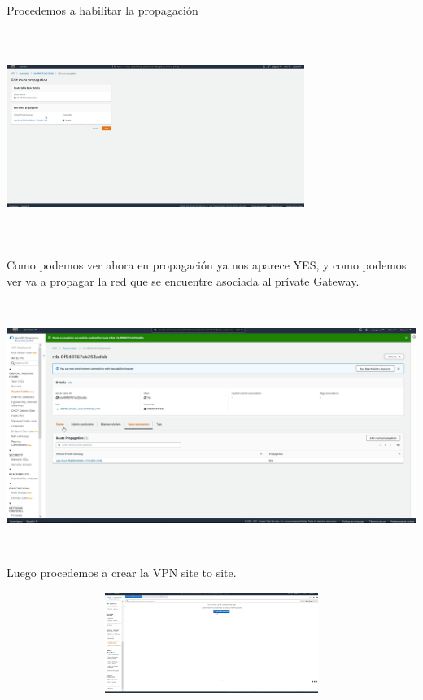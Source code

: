 \documentclass{article} %
\begin{document}
\noindent 

\noindent Procedemos a habilitar la propagaci\'{o}n

\noindent 

\noindent \includegraphics*[width=3.81in, height=2.72in, trim=0.00in 2.13in 6.39in 0.00in]{image18}

\noindent Como podemos ver ahora en propagaci\'{o}n ya nos aparece YES, y como podemos ver va a propagar la red que se encuentre asociada al pr\'{i}vate Gateway. 

\noindent 

\noindent \includegraphics*[width=5.73in, height=3.19in, trim=1.07in 1.37in 3.09in 0.14in]{image19}

\noindent 

\noindent Luego procedemos a crear la VPN site to site. 

\noindent 

\noindent \includegraphics*[width=6.21in, height=1.29in, trim=0.00in 2.72in 2.58in 0.00in]{image20}
\end{document}

